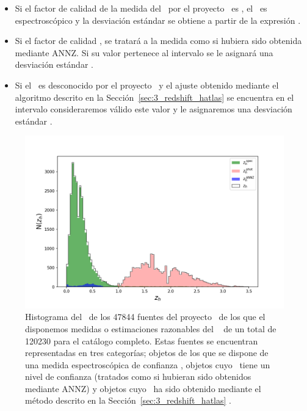\begin{itemize}
    \item Si el factor de calidad de la medida del \rt\ por el proyecto \hatlas\ es , el \rt\ es espectroscópico y la desviación estándar se obtiene a partir de la expresión .
    
    \item Si el factor de calidad , se tratará a la medida como si hubiera sido obtenida mediante ANNZ. Si su valor pertenece al intervalo  se le asignará una desviación estándar .
    
    \item Si el \rt\ es desconocido por el proyecto \hatlas\ y el ajuste obtenido mediante el algoritmo descrito en la Sección~\ref{sec:3_redshift_hatlas} se encuentra en el intervalo  consideraremos válido este valor y le asignaremos una desviación estándar   .
\end{itemize}

\begin{figure}[htb]
    \begin{center}
         \includegraphics[width=15cm]{2_Muestras/histograma_z_hatlas_disponible.png}
    \end{center}
    \vspace*{-10mm}
    \caption{\small Histograma del \rt\ de los 47844 fuentes del proyecto \hatlas\ de los que el disponemos medidas o estimaciones  razonables del \rt\  de un total de 120230 para el catálogo completo. Estas fuentes se encuentran representadas en tres categorías; objetos de los que se dispone de una medida espectroscópica de confianza , objetos cuyo \rt\ tiene un nivel de confianza  (tratados como si hubieran sido obtenidos mediante ANNZ)  y objetos cuyo \rt\ ha sido obtenido mediante el método descrito en la Sección~\ref{sec:3_redshift_hatlas} . }
    \label{fig:histograma_z_hatlas}
\end{figure}

